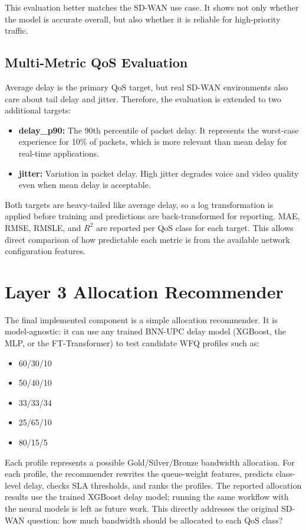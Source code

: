 \documentclass[a4paper,12pt]{Classes/RoboticsLaTeX}
\begin{document}
This evaluation better matches the SD-WAN use case. It shows not only whether the model is accurate overall, but also whether it is reliable for high-priority traffic.

\subsection{Multi-Metric QoS Evaluation}

Average delay is the primary QoS target, but real SD-WAN environments also care about tail delay and jitter. Therefore, the evaluation is extended to two additional targets:

\begin{itemize}
    \item \textbf{delay\_p90:} The 90th percentile of packet delay. It represents the worst-case experience for 10\% of packets, which is more relevant than mean delay for real-time applications.
    \item \textbf{jitter:} Variation in packet delay. High jitter degrades voice and video quality even when mean delay is acceptable.
\end{itemize}

Both targets are heavy-tailed like average delay, so a log transformation is applied before training and predictions are back-transformed for reporting. MAE, RMSE, RMSLE, and $R^2$ are reported per QoS class for each target. This allows direct comparison of how predictable each metric is from the available network configuration features.

\section{Layer 3 Allocation Recommender}

The final implemented component is a simple allocation recommender. It is model-agnostic: it can use any trained BNN-UPC delay model (XGBoost, the MLP, or the FT-Transformer) to test candidate WFQ profiles such as:

\begin{itemize}
    \item 60/30/10
    \item 50/40/10
    \item 33/33/34
    \item 25/65/10
    \item 80/15/5
\end{itemize}

Each profile represents a possible Gold/Silver/Bronze bandwidth allocation. For each profile, the recommender rewrites the queue-weight features, predicts class-level delay, checks SLA thresholds, and ranks the profiles. The reported allocation results use the trained XGBoost delay model; running the same workflow with the neural models is left as future work. This directly addresses the original SD-WAN question: how much bandwidth should be allocated to each QoS class?
\end{document}
